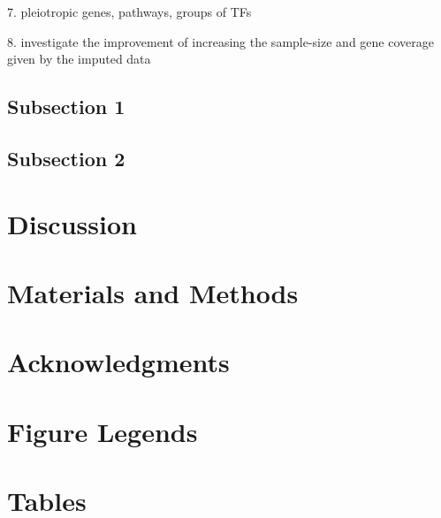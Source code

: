 \documentclass[10pt]{article}
\begin{document}
7. pleiotropic genes, pathways, groups of TFs

8. investigate the improvement of increasing the sample-size and gene coverage given by the imputed data


\subsection*{Subsection 1}

\subsection*{Subsection 2}

\section*{Discussion}

\section*{Materials and Methods}

\section*{Acknowledgments}




\section*{Figure Legends}


\section*{Tables}
\end{document}

